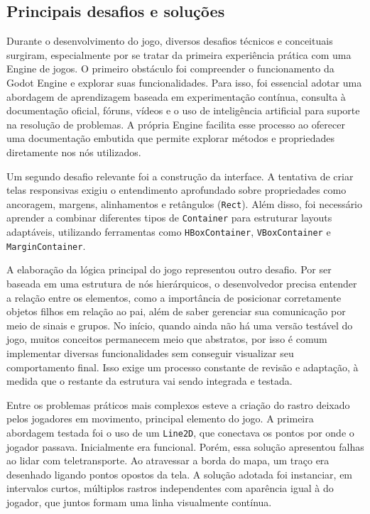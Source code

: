 \subsection{Principais desafios e soluções}

Durante o desenvolvimento do jogo, diversos desafios técnicos e conceituais surgiram, especialmente por se tratar da primeira experiência prática com uma Engine de jogos. O primeiro obstáculo foi compreender o funcionamento da Godot Engine e explorar suas funcionalidades. Para isso, foi essencial adotar uma abordagem de aprendizagem baseada em experimentação contínua, consulta à documentação oficial, fóruns, vídeos e o uso de inteligência artificial para suporte na resolução de problemas. A própria Engine facilita esse processo ao oferecer uma documentação embutida que permite explorar métodos e propriedades diretamente nos nós utilizados.

Um segundo desafio relevante foi a construção da interface. A tentativa de criar telas responsivas exigiu o entendimento aprofundado sobre propriedades como ancoragem, margens, alinhamentos e retângulos (\texttt{Rect}). Além disso, foi necessário aprender a combinar diferentes tipos de \texttt{Container} para estruturar layouts adaptáveis, utilizando ferramentas como \texttt{HBoxContainer}, \texttt{VBoxContainer} e \texttt{MarginContainer}.

A elaboração da lógica principal do jogo representou outro desafio. Por ser baseada em uma estrutura de nós hierárquicos, o desenvolvedor precisa entender a relação entre os elementos, como a importância de posicionar corretamente objetos filhos em relação ao pai, além de saber gerenciar sua comunicação por meio de sinais e grupos. No início, quando ainda não há uma versão testável do jogo, muitos conceitos permanecem meio que abstratos, por isso é comum implementar diversas funcionalidades sem conseguir visualizar seu comportamento final. Isso exige um processo constante de revisão e adaptação, à medida que o restante da estrutura vai sendo integrada e testada.

Entre os problemas práticos mais complexos esteve a criação do rastro deixado pelos jogadores em movimento, principal elemento do jogo. A primeira abordagem testada foi o uso de um \texttt{Line2D}, que conectava os pontos por onde o jogador passava. Inicialmente era funcional. Porém, essa solução apresentou falhas ao lidar com teletransporte. Ao atravessar a borda do mapa, um traço era desenhado ligando pontos opostos da tela. A solução adotada foi instanciar, em intervalos curtos, múltiplos rastros independentes com aparência igual à do jogador, que juntos formam uma linha visualmente contínua.

